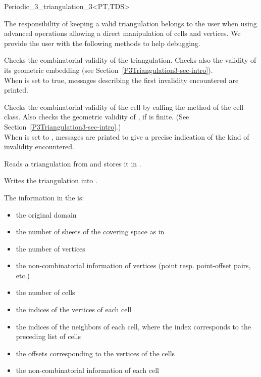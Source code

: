 \begin{ccRefClass}{Periodic_3_triangulation_3<PT,TDS>}
\begin{ccAdvanced}
The responsibility of keeping a valid triangulation belongs to the user
when using advanced operations allowing a direct manipulation of cells
and vertices. We provide the user with the following methods to help
debugging. 

{Checks the combinatorial validity of the triangulation. Checks also the
validity of its geometric embedding (see
Section~\ref{P3Triangulation3-sec-intro}).\\ When 
is set to true, messages describing the first invalidity encountered
are printed.} 

{Checks the combinatorial validity of the cell by calling the
 method of the  cell
class. Also checks the geometric validity of , if  is
finite. (See Section~\ref{P3Triangulation3-sec-intro}.)\\ 
When  is set to , messages are printed to give
a precise indication of the kind of invalidity encountered.}

\end{ccAdvanced}


{Reads a triangulation from  and stores it in .
}

{Writes the triangulation  into .}

The information in the  is:
\begin{itemize}
\item the original domain
\item the number of sheets of the covering space as in
\item the number of vertices
\item the non-combinatorial information of vertices (point
  resp. point-offset pairs, etc.)
\item the number of cells
\item the indices of the vertices of each cell
\item the indices of the neighbors of each cell, where the index
  corresponds to the preceding list of cells
\item the offsets corresponding to the vertices of the cells
\item the non-combinatorial information of each cell
\end{itemize}

\ccSeeAlso



\end{ccRefClass}
